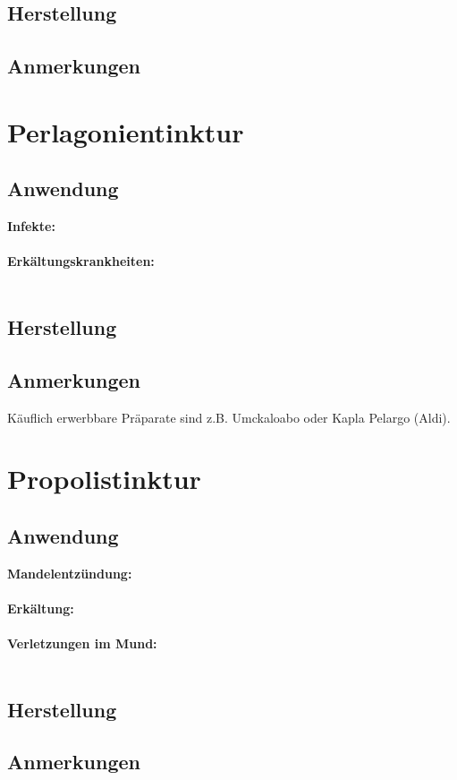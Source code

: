\subsection{Herstellung}

\subsection{Anmerkungen}





\section{Perlagonientinktur}

\subsection{Anwendung}

\textbf{Infekte:} \\ \\
\textbf{Erkältungskrankheiten:} \\ \\


\subsection{Herstellung}

\subsection{Anmerkungen}

Käuflich erwerbbare Präparate sind z.B. Umckaloabo oder Kapla Pelargo (Aldi).



\section{Propolistinktur}

\subsection{Anwendung}

\textbf{Mandelentzündung:} \\ \\
\textbf{Erkältung:} \\ \\
\textbf{Verletzungen im Mund:} \\ \\


\subsection{Herstellung}

\subsection{Anmerkungen}

